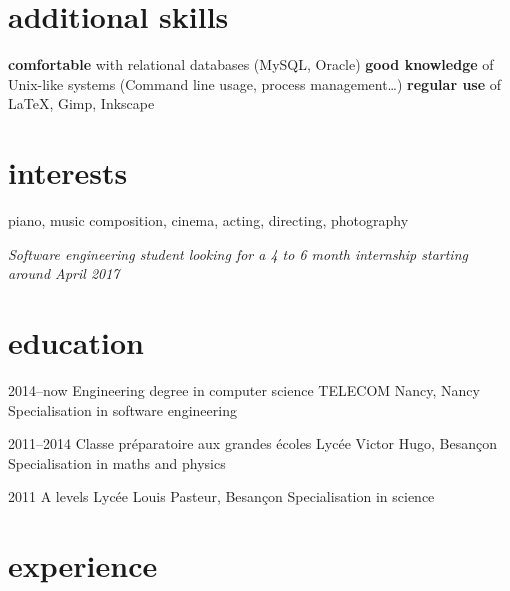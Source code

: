 \documentclass[]{lemaki-cv}
\begin{document}
\begin{aside}
		\section{additional skills}
		\footnotesize\textbf{comfortable} with relational databases (MySQL, Oracle)
		\footnotesize\textbf{good knowledge} of Unix-like systems (Command line usage, process
		management\ldots)
		\footnotesize\textbf{regular use} of LaTeX, Gimp, Inkscape
		\section{interests}
		\footnotesize piano, music composition, cinema, acting, directing, photography
	\end{aside}

		\emph{\small Software engineering student looking for a 4 to 6 month internship
		starting around April 2017}


		\section{education}

		\begin{entrylist}


			\entry
			{2014--now}
			{Engineering degree {\normalfont in computer science}}
			{TELECOM Nancy, Nancy}
			{Specialisation in software engineering}


			\entry
			{2011--2014}
			{Classe préparatoire aux grandes écoles}
			{Lycée Victor Hugo, Besançon}
			{Specialisation in maths and physics}


			\entry
			{2011}
			{A levels}
			{Lycée Louis Pasteur, Besançon}
			{Specialisation in science}


		\end{entrylist}


		\section{experience}
\end{document}
